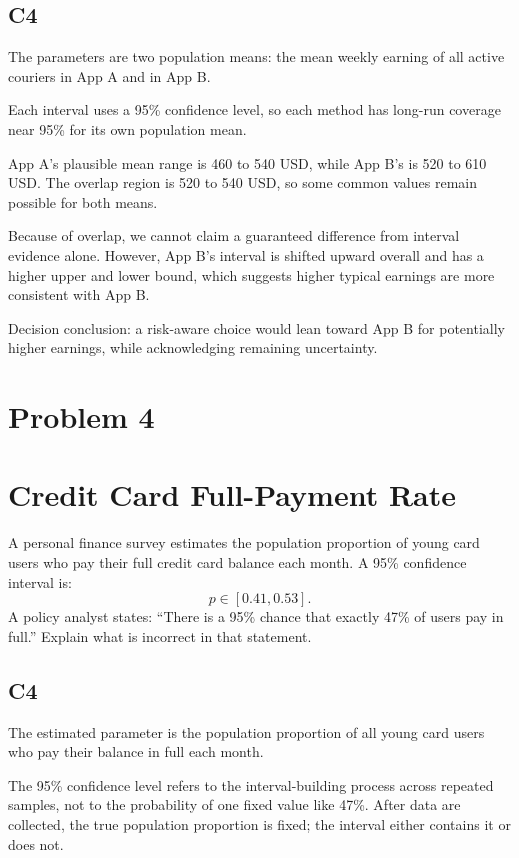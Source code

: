 \begin{ExamProblems}
		\subsection*{C4}
		The parameters are two population means: the mean weekly earning of all active couriers in App A and in App B.

		Each interval uses a 95\% confidence level, so each method has long-run coverage near 95\% for its own population mean.

		App A's plausible mean range is 460 to 540 USD, while App B's is 520 to 610 USD.
		The overlap region is 520 to 540 USD, so some common values remain possible for both means.

		Because of overlap, we cannot claim a guaranteed difference from interval evidence alone.
		However, App B's interval is shifted upward overall and has a higher upper and lower bound, which suggests higher typical earnings are more consistent with App B.

		Decision conclusion: a risk-aware choice would lean toward App B for potentially higher earnings, while acknowledging remaining uncertainty.

		\newpage
		\item
		\section{Problem 4}
		\section{Credit Card Full-Payment Rate}
		A personal finance survey estimates the population proportion of young card users who pay their full credit card balance each month.
		A 95\% confidence interval is:
		\[
		p \in [0.41, 0.53].
		\]
		A policy analyst states: ``There is a 95\% chance that exactly 47\% of users pay in full.''
		Explain what is incorrect in that statement.

		\subsection*{C4}
		The estimated parameter is the population proportion of all young card users who pay their balance in full each month.

		The 95\% confidence level refers to the interval-building process across repeated samples, not to the probability of one fixed value like 47\%.
		After data are collected, the true population proportion is fixed; the interval either contains it or does not.


\end{ExamProblems}
